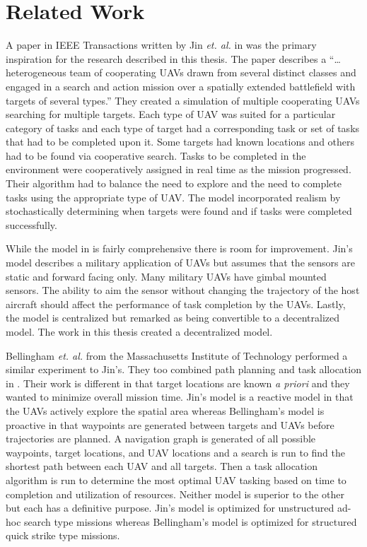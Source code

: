 \chapter{Related Work}

A paper in IEEE Transactions written by Jin \textit{et. al.} in \cite{jin} was the primary inspiration for the research described in this thesis.  The paper describes a ``\ldots heterogeneous team of cooperating UAVs drawn from several distinct classes and engaged in a search and action mission over a spatially extended battlefield with targets of several types.'' They created a simulation of multiple cooperating UAVs searching for multiple targets.  Each type of UAV was suited for a particular category of tasks and each type of target had a corresponding task or set of tasks that had to be completed upon it.  Some targets had known locations and others had to be found via cooperative search.  Tasks to be completed in the environment were cooperatively assigned in real time as the mission progressed.  Their algorithm had to balance the need to explore and the need to complete tasks using the appropriate type of UAV.  The model incorporated realism by stochastically determining when targets were found and if tasks were completed successfully.

While the model in \cite{jin} is fairly comprehensive there is room for improvement.  Jin's model describes a military application of UAVs but assumes that the sensors are static and forward facing only.  Many military UAVs have gimbal mounted sensors.  The ability to aim the sensor without changing the trajectory of the host aircraft should affect the performance of task completion by the UAVs.  Lastly, the model is centralized but remarked as being convertible to a decentralized model.  The work in this thesis created a decentralized model.


Bellingham \textit{et. al.} from the Massachusetts Institute of Technology performed a similar experiment to Jin's.   They too combined path planning and task allocation in \cite{bellingham}.  Their work is different in that target locations are known \textit{a priori} and they wanted to minimize overall mission time.  Jin's model is a reactive model in that the UAVs actively explore the spatial area whereas Bellingham's model is proactive in that waypoints are generated between targets and UAVs before trajectories are planned.  A navigation graph is generated of all possible waypoints, target locations, and UAV locations and a search is run to find the shortest path between each UAV and all targets.  Then a task allocation algorithm is run to determine the most optimal UAV tasking based on time to completion and utilization of resources.  Neither model is superior to the other but each has a definitive purpose.  Jin's model is optimized for unstructured ad-hoc search type missions whereas Bellingham's model is optimized for structured quick strike type missions.

